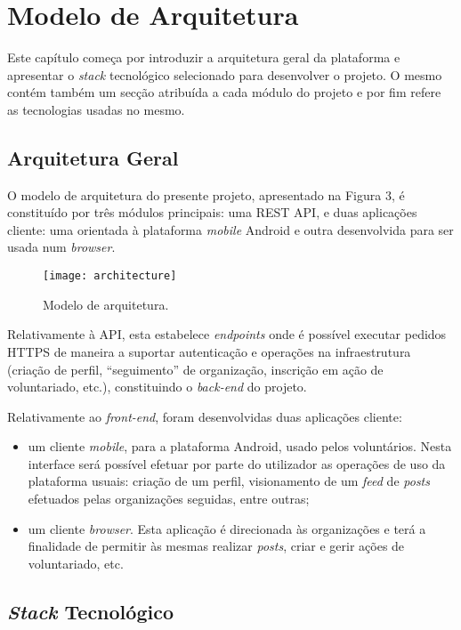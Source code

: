 \section{Modelo de Arquitetura} 
Este capítulo começa por introduzir a arquitetura geral da plataforma e apresentar o \textit{stack} tecnológico selecionado para desenvolver o projeto. O mesmo contém também um secção atribuída a cada módulo do projeto e por fim refere as tecnologias usadas no mesmo.
\par \medskip

\subsection{Arquitetura Geral}

O modelo de arquitetura do presente projeto, apresentado na Figura 3, é constituído por três módulos principais: uma REST API, e duas aplicações cliente: uma orientada à plataforma \textit{mobile} Android e outra desenvolvida para ser usada num \textit{browser}. \par \medskip

\begin{figure}[h]
	\centering
	\texttt{[image: architecture]}
	\caption{Modelo de arquitetura.}
\end{figure}

Relativamente à API, esta estabelece \textit{endpoints} onde é possível executar pedidos HTTPS de maneira a suportar autenticação e operações na infraestrutura (criação de perfil, “seguimento” de organização, inscrição em ação de voluntariado, etc.), constituindo o \textit{back-end} do projeto.
\par \medskip

Relativamente ao \textit{front-end}, foram desenvolvidas duas aplicações cliente: 
\begin{itemize}
	\item um cliente \textit{mobile}, para a plataforma Android, usado pelos voluntários. Nesta interface será possível efetuar por parte do utilizador as operações de uso da plataforma usuais: criação de um perfil, visionamento de um \textit{feed} de \textit{posts} efetuados pelas organizações seguidas, entre outras;
	\item um cliente \textit{browser}. Esta aplicação é direcionada às organizações e terá a finalidade de permitir às mesmas realizar \textit{posts}, criar e gerir ações de voluntariado, etc.
\end{itemize}

\subsection{\textit{Stack} Tecnológico}

